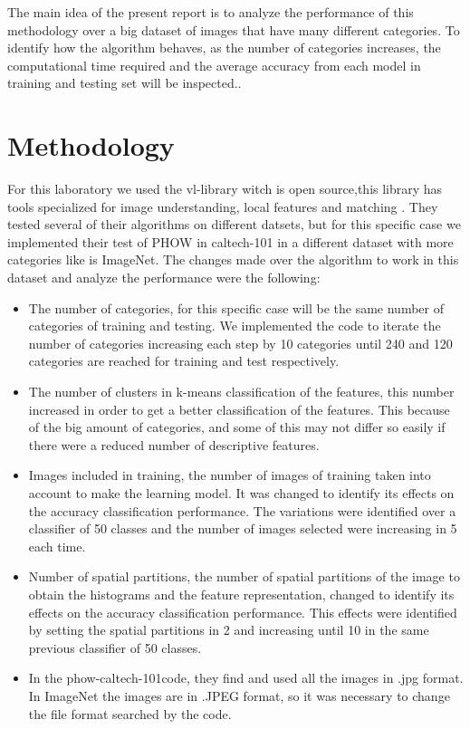 \documentclass[10pt,twocolumn,letterpaper]{article}
\begin{document}
The main idea of the present report is to analyze the performance of this methodology over a big dataset of images that have many different categories. To identify how the algorithm behaves, as the number of categories increases, the computational time required and the average accuracy from each model in training and testing set will be inspected..

\section{Methodology}
For this laboratory we used the vl-library witch is open source,this library has tools specialized for image understanding, local features and matching \cite{vedaldi2010vlfeat}. They tested several of their algorithms on different datsets, but for this specific case we implemented their test of PHOW in caltech-101 in a different dataset with more categories like is ImageNet. The changes made over the algorithm to work in this dataset and analyze the performance were the following:

\begin{itemize}
\item The number of categories, for this specific case will be the same number of categories of training and testing. We implemented the code to iterate the number of categories increasing each step by 10 categories until 240 and 120 categories are reached for training and test respectively.
\item The number of clusters in k-means classification of the features,  this number increased in order to get a better classification of the features. This because of the big amount of categories, and some of this may not differ so easily if there were a reduced number of descriptive features. 
\item Images included in training, the number of images of training taken into account to make the learning model. It was changed to identify its effects on the accuracy classification performance. The variations were identified over a classifier of 50 classes and the number of images selected were increasing in 5 each time.
\item Number of spatial partitions, the number of spatial partitions of the image to obtain the histograms and the feature representation, changed to identify its effects on the accuracy classification performance. This effects were identified by setting the spatial partitions in 2 and increasing until 10 in the same previous classifier of 50 classes.
\item In the phow-caltech-101code, they find and used all the images in .jpg format. In ImageNet the images are in .JPEG format, so it was necessary to change the file format searched by the code.
\end{itemize}
\end{document}
